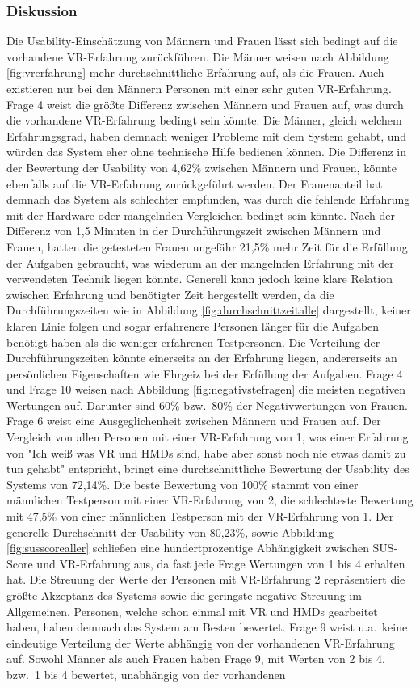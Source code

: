 \subsubsection{Diskussion}
Die Usability-Einschätzung von Männern und Frauen lässt sich bedingt auf die vorhandene VR-Erfahrung zurückführen. Die Männer weisen nach Abbildung \ref{fig:vrerfahrung} mehr durchschnittliche Erfahrung auf, als die Frauen. Auch existieren nur bei den Männern Personen mit einer sehr guten VR-Erfahrung. Frage 4 weist die größte Differenz zwischen Männern und Frauen auf, was durch die vorhandene VR-Erfahrung bedingt sein könnte. Die Männer, gleich welchem Erfahrungsgrad, haben demnach weniger Probleme mit dem System gehabt, und würden das System eher ohne technische Hilfe bedienen können. Die Differenz in der Bewertung der Usability von 4,62\% zwischen Männern und Frauen, könnte ebenfalls auf die VR-Erfahrung zurückgeführt werden. Der Frauenanteil hat demnach das System als schlechter empfunden, was durch die fehlende Erfahrung mit der Hardware oder mangelnden Vergleichen bedingt sein könnte. Nach der Differenz von 1,5 Minuten in der Durchführungszeit zwischen Männern und Frauen, hatten die getesteten Frauen ungefähr 21,5\% mehr Zeit für die Erfüllung der Aufgaben gebraucht, was wiederum an der mangelnden Erfahrung mit der verwendeten Technik liegen könnte. Generell kann jedoch keine klare Relation zwischen Erfahrung und benötigter Zeit hergestellt werden, da die Durchführungszeiten wie in Abbildung \ref{fig:durchschnittzeitalle} dargestellt, keiner klaren Linie folgen und sogar erfahrenere Personen länger für die Aufgaben benötigt haben als die weniger erfahrenen Testpersonen. Die Verteilung der Durchführungszeiten könnte einerseits an der Erfahrung liegen, andererseits an persönlichen Eigenschaften wie Ehrgeiz bei der Erfüllung der Aufgaben. Frage 4 und Frage 10 weisen nach Abbildung \ref{fig:negativstefragen} die meisten negativen Wertungen auf. Darunter sind 60\% bzw.~80\% der Negativwertungen von Frauen. Frage 6 weist eine Ausgeglichenheit zwischen Männern und Frauen auf. Der Vergleich von allen Personen mit einer VR-Erfahrung von 1, was einer Erfahrung von "Ich weiß was VR und HMDs sind, habe aber sonst noch nie etwas damit zu tun gehabt" entspricht, bringt eine durchschnittliche Bewertung der Usability des Systems von 72,14\%. Die beste Bewertung von 100\% stammt von einer männlichen Testperson mit einer VR-Erfahrung von 2, die schlechteste Bewertung mit 47,5\% von einer männlichen Testperson mit der VR-Erfahrung von 1. Der generelle Durchschnitt der Usability von 80,23\%, sowie Abbildung \ref{fig:susscorealler} schließen eine hundertprozentige Abhängigkeit zwischen SUS-Score und VR-Erfahrung aus, da fast jede Frage Wertungen von 1 bis 4 erhalten hat. Die Streuung der Werte der Personen mit VR-Erfahrung 2 repräsentiert die größte Akzeptanz des Systems sowie die geringste negative Streuung im Allgemeinen. Personen, welche schon einmal mit VR und HMDs gearbeitet haben, haben demnach das System am Besten bewertet. Frage 9 weist u.a.~keine eindeutige Verteilung der Werte abhängig von der vorhandenen VR-Erfahrung auf. Sowohl Männer als auch Frauen haben Frage 9, mit Werten von 2 bis 4, bzw.~1 bis 4 bewertet, unabhängig von der vorhandenen 